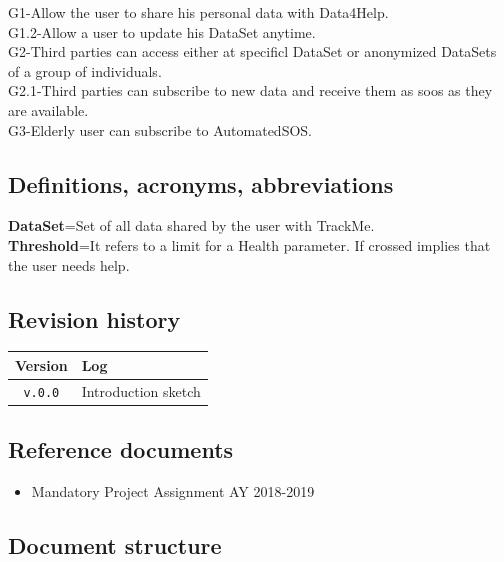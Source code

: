 \documentclass[12pt]{article}
\begin{document}
G1-Allow the user to share his personal data with Data4Help.\\
G1.2-Allow a user to update his DataSet anytime.\\
G2-Third parties can access either at specificl DataSet or anonymized DataSets of a group of individuals.\\
G2.1-Third parties can subscribe to new data and receive them as soos as they are available.\\
G3-Elderly user can subscribe to AutomatedSOS.\\
  \subsection{Definitions, acronyms, abbreviations}
\textbf{DataSet}=Set of all data shared by the user with TrackMe.\\
\textbf{Threshold}=It refers to a limit for a Health parameter. If crossed implies that the user needs help. \\
  \subsection{Revision history}
  \label{sec:revhistory}

    \begin{table}[h]
      \begin{tabular}{|c|l|}
        \hline
        \textbf{Version}                & \textbf{Log} \\ \hline
        \texttt{v.0.0} &
          Introduction sketch
        \\ \hline
      \end{tabular}
    \end{table}

  \subsection{Reference documents}

    \begin{itemize}
      \item Mandatory Project Assignment AY 2018-2019
    \end{itemize}

  \subsection{Document structure}
\end{document}
